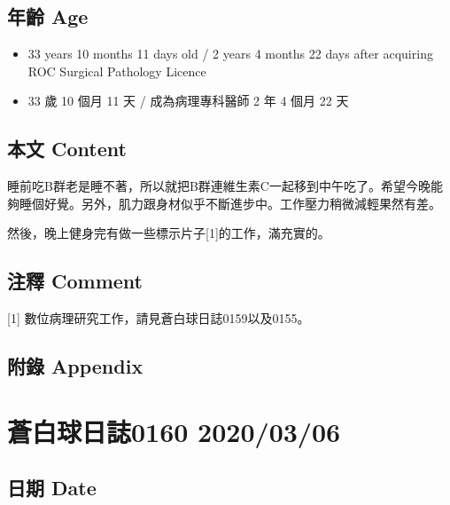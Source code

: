 \documentclass[a5paper, 12pt
]{book}
\providecommand{\tightlist}{%
  \setlength{\itemsep}{0pt}\setlength{\parskip}{0pt}}
\begin{document}
\hypertarget{ux5e74ux9f61-age-4}{%
\subsection{年齡 Age}\label{ux5e74ux9f61-age-4}}

\begin{itemize}
\tightlist
\item
  33 years 10 months 11 days old / 2 years 4 months 22 days after
  acquiring ROC Surgical Pathology Licence
\item
  33 歲 10 個月 11 天 / 成為病理專科醫師 2 年 4 個月 22 天
\end{itemize}

\hypertarget{ux672cux6587-content-4}{%
\subsection{本文 Content}\label{ux672cux6587-content-4}}

睡前吃B群老是睡不著，所以就把B群連維生素C一起移到中午吃了。希望今晚能夠睡個好覺。另外，肌力跟身材似乎不斷進步中。工作壓力稍微減輕果然有差。

然後，晚上健身完有做一些標示片子{[}1{]}的工作，滿充實的。

\hypertarget{ux6ce8ux91cb-comment-4}{%
\subsection{注釋 Comment}\label{ux6ce8ux91cb-comment-4}}

{[}1{]} 數位病理研究工作，請見蒼白球日誌0159以及0155。

\hypertarget{ux9644ux9304-appendix-4}{%
\subsection{附錄 Appendix}\label{ux9644ux9304-appendix-4}}

\hypertarget{ux84bcux767dux7403ux65e5ux8a8c0160-20200306}{%
\section{蒼白球日誌0160
2020/03/06}\label{ux84bcux767dux7403ux65e5ux8a8c0160-20200306}}

\hypertarget{ux65e5ux671f-date-5}{%
\subsection{日期 Date}\label{ux65e5ux671f-date-5}}
\end{document}

